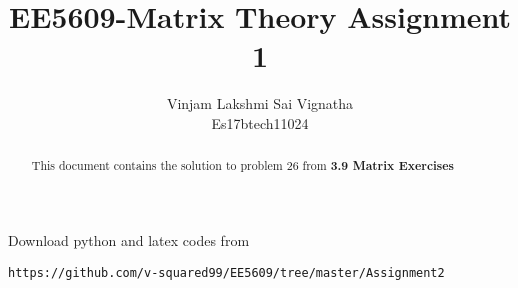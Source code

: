 \documentclass[journal,12pt,twocolumn]{IEEEtran}
\begin{document}
\newtheorem{theorem}{Theorem}[section]
\newtheorem{problem}{Problem}
\newtheorem{proposition}{Proposition}[section]
\newtheorem{lemma}{Lemma}[section]
\newtheorem{corollary}[theorem]{Corollary}
\newtheorem{example}{Example}[section]
\newtheorem{definition}[problem]{Definition}

\newcommand{\BEQA}{\begin{eqnarray}}
\newcommand{\EEQA}{\end{eqnarray}}
\newcommand{\define}{\stackrel{\triangle}{=}}

\providecommand{\mbf}{\mathbf}
\providecommand{\pr}[1]{\ensuremath{\Pr\left(#1\right)}}
\providecommand{\qfunc}[1]{\ensuremath{Q\left(#1\right)}}
\providecommand{\sbrak}[1]{\ensuremath{{}\left[#1\right]}}
\providecommand{\lsbrak}[1]{\ensuremath{{}\left[#1\right.}}
\providecommand{\rsbrak}[1]{\ensuremath{{}\left.#1\right]}}
\providecommand{\brak}[1]{\ensuremath{\left(#1\right)}}
\providecommand{\lbrak}[1]{\ensuremath{\left(#1\right.}}
\providecommand{\rbrak}[1]{\ensuremath{\left.#1\right)}}
\providecommand{\cbrak}[1]{\ensuremath{\left\{#1\right\}}}
\providecommand{\lcbrak}[1]{\ensuremath{\left\{#1\right.}}
\providecommand{\rcbrak}[1]{\ensuremath{\left.#1\right\}}}
\theoremstyle{remark}
\newtheorem{rem}{Remark}
\newcommand{\sgn}{\mathop{\mathrm{sgn}}}
\providecommand{\system}{\overset{\mathcal{H}}{ \longleftrightarrow}}
\newcommand{\solution}{\noindent \textbf{Solution: }}
\newcommand{\cosec}{\,\text{cosec}\,}
\providecommand{\dec}[2]{\ensuremath{\overset{#1}{\underset{#2}{\gtrless}}}}
\newcommand{\myvec}[1]{\ensuremath{\begin{pmatrix}#1\end{pmatrix}}}
\newcommand{\mydet}[1]{\ensuremath{\begin{vmatrix}#1\end{vmatrix}}}
\makeatletter
{}
\makeatother
\let\StandardTheFigure\thefigure
\let\vec\mathbf
\renewcommand{\thefigure}{\theproblem}
\def\putbox#1#2#3{\makebox[0in][l]{\makebox[#1][l]{}\raisebox{\baselineskip}[0in][0in]{\raisebox{#2}[0in][0in]{#3}}}}
     \def\rightbox#1{\makebox[0in][r]{#1}}
     \def\centbox#1{\makebox[0in]{#1}}
     \def\topbox#1{\raisebox{-\baselineskip}[0in][0in]{#1}}
     \def\midbox#1{\raisebox{-0.5\baselineskip}[0in][0in]{#1}}
\vspace{3cm}
\title{EE5609-Matrix Theory Assignment 1}
\author{Vinjam Lakshmi Sai Vignatha \\ Es17btech11024}
\maketitle
\newpage
\bigskip
\renewcommand{\thefigure}{\theenumi}
\renewcommand{\thetable}{\theenumi}
Download python and latex codes from 
\begin{lstlisting}
https://github.com/v-squared99/EE5609/tree/master/Assignment2
\end{lstlisting}
\begin{abstract}
This document contains the solution to problem 26 from \textbf{3.9 Matrix Exercises}
\end{abstract}
\end{document}
